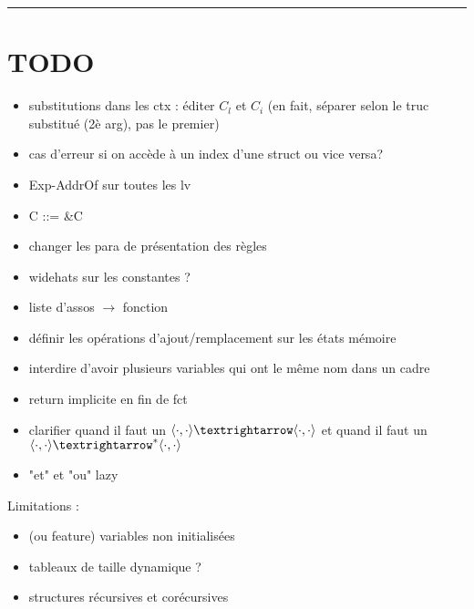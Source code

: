 \begin{center}\rule{3in}{0.4pt}\end{center}

\section*{TODO}

\begin{itemize}
\item substitutions dans les ctx : éditer $C_l$ et $C_i$
  (en fait, séparer selon le truc substitué (2è arg), pas le premier)
\item cas d'erreur si on accède à un index d'une struct ou vice versa?
\item Exp-AddrOf sur toutes les lv
\item C ::= \&C
\item changer les para de présentation des règles
\item widehats sur les constantes ?
\item liste d'assos $→$ fonction
\item définir les opérations d'ajout/remplacement sur les états mémoire
\item interdire d'avoir plusieurs variables qui ont le même nom dans un cadre
\item return implicite en fin de fct
\item clarifier quand il faut un $\mm{\cdot}{\cdot}{\cdot}{\cdot}$
             et quand il faut un $\mmstar{\cdot}{\cdot}{\cdot}{\cdot}$
\item "et" et "ou" lazy
\end{itemize}

Limitations :

\begin{itemize}
\item (ou feature) variables non initialisées
\item tableaux de taille dynamique ?
\item structures récursives et corécursives
\end{itemize}

